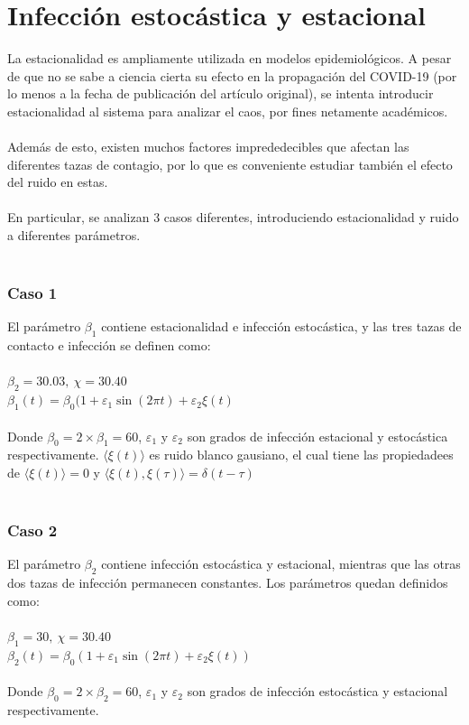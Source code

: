\documentclass[conference]{IEEEtran}
\begin{document}
\section{Infección estocástica y estacional}

La estacionalidad es ampliamente utilizada en modelos epidemiológicos. A pesar de que no se sabe
a ciencia cierta su efecto en la propagación del COVID-19 (por lo menos a la fecha
de publicación del artículo original), se intenta introducir estacionalidad al sistema para analizar el caos, 
por fines netamente académicos.
\\\\
Además de esto, existen muchos factores imprededecibles que afectan las diferentes tazas de contagio,
por lo que es conveniente estudiar también el efecto del ruido en estas.
\\\\
En particular, se analizan 3 casos diferentes, introduciendo estacionalidad y ruido a diferentes parámetros.
\\\\
\subsubsection{Caso 1}

El parámetro $\beta_1$ contiene estacionalidad e infección estocástica, y las tres tazas de contacto e infección se definen como:
\\\\
$\beta_2 = 30.03, \ \chi = 30.40$
\\
$\beta_1(t) = \beta_0(1 + \varepsilon_1 \sin(2\pi t) + \varepsilon_2 \xi(t)$
\\\\
Donde $\beta_0 = 2 \times \beta_1 = 60$, $\varepsilon_1$ y $\varepsilon_2$ son grados de infección 
estacional y estocástica respectivamente. $\langle \xi(t) \rangle$ es ruido blanco gausiano, 
el cual tiene las propiedadees de $\langle \xi(t) \rangle = 0$ y $\langle \xi(t), \xi(\tau) \rangle = \delta(t - \tau)$
\\\\
\subsubsection{Caso 2}

El parámetro $\beta_2$ contiene infección estocástica y estacional, mientras que las otras dos tazas de infección permanecen constantes. Los parámetros quedan definidos como:
\\\\
$\beta_1 = 30, \ \chi = 30.40$
\\
$\beta_2(t) = \beta_0(1+\varepsilon_1 \sin(2 \pi t) + \varepsilon_2 \xi(t))$
\\\\
Donde $\beta_0 = 2 \times \beta_2 = 60$, $\varepsilon_1$ y $\varepsilon_2$ son grados de infección estocástica y estacional respectivamente.
\\\\
\end{document}
